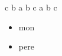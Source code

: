 \documentclass{article}
\begin{document}
c
b
a
b
c
a
b
c



\begin{itemize}  
\item mon
\item pere
\end{itemize}

\end{document}
